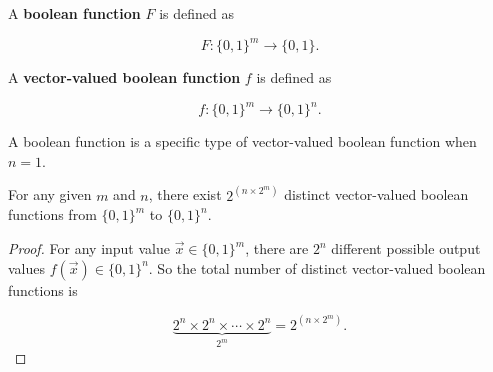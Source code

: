 \begin{definition}
A \textbf{boolean function} $F$ is defined as

\begin{equation}
    F:\{0,1\}^m \rightarrow\{0,1\}.
\end{equation}

A \textbf{vector-valued boolean function} $f$ is defined as

\begin{equation}
    f:\{0,1\}^m \rightarrow\{0,1\}^n.
\end{equation}
\end{definition}

A boolean function is a specific type of vector-valued boolean function when $n=1$. 

\begin{remark}
For any given $m$ and $n$, there exist $2^{(n \times 2^m)}$ distinct vector-valued boolean functions from $\{0,1\}^m$ to $\{0,1\}^n$.
\end{remark}

\begin{proof}
For any input value $\vec{x} \in \{0,1\}^m$, there are $2^n$ different possible output values $f(\vec{x}) \in \{0,1\}^n$. So the total number of distinct vector-valued boolean functions is 

\begin{equation}
    \underbrace{2^n \times 2^n \times \cdots \times 2^n}_{2^m}=2^{\left(n \times 2^m\right)}.
\end{equation}
\end{proof}
